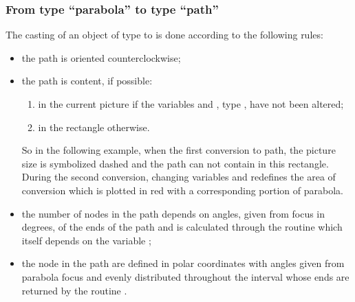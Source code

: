 \documentclass[pdftex]{article}
\begin{document}
\subsubsection{From type ``parabola'' to type ``path''}
The casting of an object  of type  to 
is done according to the following rules:
\begin{itemize}
\item the path is oriented counterclockwise;
\item the path is content, if possible:
  \begin{enumerate}
  \item in the current picture if the variables 
    and , type ,  have not been altered;
  \item in the rectangle  otherwise.
  \end{enumerate}
  So in the following example, when the first conversion to path,
  the picture size is symbolized dashed and the path can not contain in
  this rectangle. During the second conversion, changing
  variables  and  redefines the area of
  conversion which is plotted in red with a corresponding portion of
  parabola.
\item the number of nodes in the path depends on angles, given from
  focus in degrees, of the ends of the path and is calculated through the routine
  \linebreak
  which itself depends on the variable ;
\item the node in the path are defined in polar coordinates with
  angles given from parabola focus and evenly distributed throughout
  the interval whose ends are returned by the routine
  .
\end{itemize}
\end{document}
